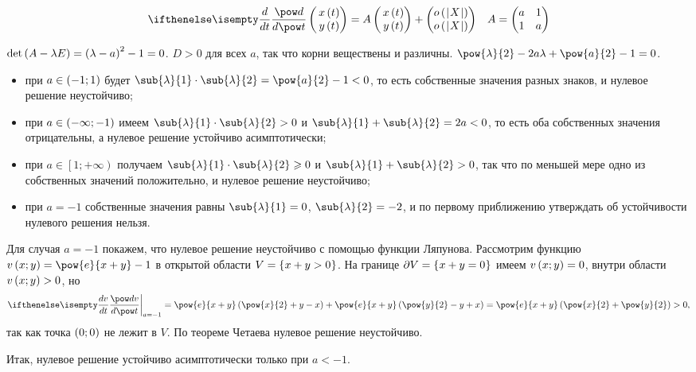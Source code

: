 \documentclass[a5paper,10pt]{article}
\begin{document}
\begin{align*} 
    \der{}{t} \begin{pmatrix} \,x\br{t} \\ \,y\br{t} \end{pmatrix} 
        = A \begin{pmatrix} \,x\br{t} \\ \,y\br{t} \end{pmatrix} 
        + \begin{pmatrix} o\br{\vbr{X}} \\ o\br{\vbr{X}} \end{pmatrix}
    && A = \begin{pmatrix} a & 1 \\ 1 & a \end{pmatrix}
\end{align*}

$\det\left(\hspace{0.01em}A - \lambda E\hspace{0.01em}\right) = \left(\hspace{0.01em}\lambda - a\hspace{0.01em}\right)^2 - 1 = 0$.
$D > 0$ для всех $a$, так что корни веществены и различны.
$\pow{\lambda}{2} - 2a \lambda + \pow{a}{2} - 1 = 0$.
\begin{itemize}
    \item при $a \in \left(\hspace{0.01em}-1; 1\hspace{0.01em}\right)$ будет
        $\sub{\lambda}{1} \cdot \sub{\lambda}{2} = \pow{a}{2} - 1 < 0$,
        то есть собственные значения разных знаков, и нулевое решение неустойчиво;
    
    \item при $a \in \left(\hspace{0.01em}-\infty; -1\hspace{0.01em}\right)$ имеем 
        $\sub{\lambda}{1} \cdot \sub{\lambda}{2} > 0$
        и $\sub{\lambda}{1} + \sub{\lambda}{2} = 2a < 0$,
        то есть оба собственных значения отрицательны,
        а нулевое решение устойчиво асимптотически;
    
    \item при $a \in \left[1; +\infty \right)$ получаем 
        $\sub{\lambda}{1} \cdot \sub{\lambda}{2} \ge 0$ 
        и $\sub{\lambda}{1} + \sub{\lambda}{2} > 0$,
        так что по меньшей мере одно из собственных значений положительно,
        и нулевое решение неустойчиво;
    
    \item при $a = -1$ собственные значения равны 
        $\sub{\lambda}{1} = 0$, $\sub{\lambda}{2} = -2$,
        и по первому приближению утверждать об устойчивости нулевого решения нельзя.
\end{itemize}

Для случая $a = -1$ покажем, что нулевое решение неустойчиво с помощью функции Ляпунова.
Рассмотрим функцию $v\br{x; y} = \pow{e}{x + y} - 1$ 
в открытой области $V = \left\{\hspace{0.03em}x + y > 0\hspace{0.03em}\right\}$. 
На границе $\partial V = \left\{\hspace{0.03em}x + y = 0\hspace{0.03em}\right\}$ имеем $v\left(\hspace{0.01em}x; y\hspace{0.01em}\right) = 0$,
внутри области $v\left(\hspace{0.01em}x; y\hspace{0.01em}\right) > 0$, но 
$$\der{v}{t}\bigg|_{a = -1}
    = \pow{e}{x + y} \br{\pow{x}{2} + y - x} + \pow{e}{x + y} \br{\pow{y}{2} - y + x} 
    = \pow{e}{x + y} \br{\pow{x}{2} + \pow{y}{2}} > 0,$$
так как точка $\left(\hspace{0.01em}0; 0\hspace{0.01em}\right)$ не лежит в $V$. По теореме Четаева нулевое решение неустойчиво.

Итак, нулевое решение устойчиво асимптотически только при $a < -1$.
\end{document}
